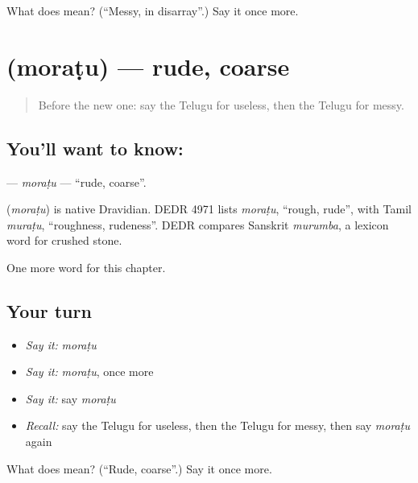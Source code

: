 \begin{tcolorbox}[breakable,colback=teal!4,colframe=teal!35!black,title={Before you move on}]
What does  mean? (\textquotedblleft{}Messy, in disarray\textquotedblright{}.) Say it once more.
\end{tcolorbox}
\section[\texorpdfstring{\te{మొరటు} (moraṭu)}{మొరటు (moraṭu)}]{ (moraṭu) — rude, coarse}

\label{lesson:TE-C223-moratu}



\begin{quote}
Before the new one: say the Telugu for useless, then the Telugu for messy.
\end{quote}

\subsection*{You'll want to know: }
\textbf{} — \emph{moraṭu} — \textquotedblleft{}rude, coarse\textquotedblright{}.

\begin{cousinweb}
\textbf{} (\emph{moraṭu}) is native Dravidian. DEDR 4971 lists \emph{moraṭu}, \textquotedblleft{}rough, rude\textquotedblright{}, with Tamil \emph{muraṭu}, \textquotedblleft{}roughness, rudeness\textquotedblright{}. DEDR compares Sanskrit \emph{murumba}, a lexicon word for crushed stone.
\end{cousinweb}

\begin{grammarlens}[title={What you've built}]
One more word for this chapter.
\end{grammarlens}

\subsection*{Your turn}
\begin{itemize}
\raggedright
  \item \emph{Say it:} \emph{moraṭu}
  \item \emph{Say it:} \emph{moraṭu}, once more
  \item \emph{Say it:} say \emph{moraṭu}
  \item \emph{Recall:} say the Telugu for useless, then the Telugu for messy, then say \emph{moraṭu} again
\end{itemize}

\begin{tcolorbox}[breakable,colback=teal!4,colframe=teal!35!black,title={Before you move on}]
What does  mean? (\textquotedblleft{}Rude, coarse\textquotedblright{}.) Say it once more.
\end{tcolorbox}
